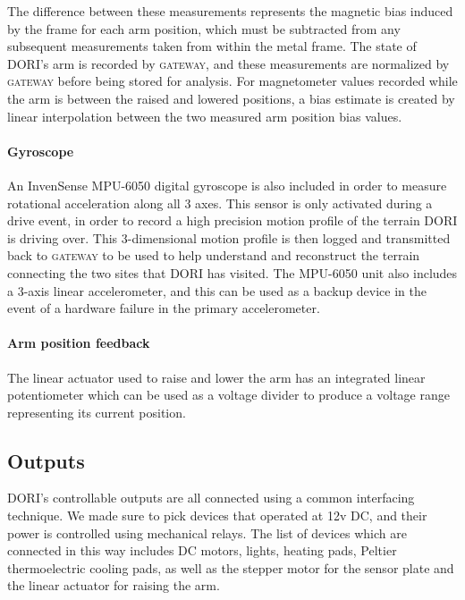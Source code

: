 \documentclass[12pt]{article}
\newcommand{\brand}{}
\begin{document}
    
    
    The difference between these measurements represents the magnetic bias induced by the frame for each arm position, which must be subtracted from any subsequent measurements taken from within the metal frame. The state of DORI's arm is recorded by \textsc{gateway}, and these measurements are normalized by \textsc{gateway} before being stored for analysis. For magnetometer values recorded while the arm is between the raised and lowered positions, a bias estimate is created by linear interpolation between the two measured arm position bias values.

    \paragraph*{Gyroscope}
    An \brand{InvenSense MPU-6050} digital gyroscope is also included in order to measure rotational acceleration along all 3 axes. This sensor is only activated during a drive event, in order to record a high precision motion profile of the terrain DORI is driving over. This 3-dimensional motion profile is then logged and transmitted back to \textsc{gateway} to be used to help understand and reconstruct the terrain connecting the two sites that DORI has visited. The \brand{MPU-6050} unit also includes a 3-axis linear accelerometer, and this can be used as a backup device in the event of a hardware failure in the primary accelerometer.

    \paragraph*{Arm position feedback}
    The linear actuator used to raise and lower the arm has an integrated linear potentiometer which can be used as a voltage divider to produce a voltage range representing its current position. 


\subsection{Outputs}
    DORI's controllable outputs are all connected using a common interfacing technique. We made sure to pick devices that operated at 12v DC, and their power is controlled using mechanical relays. The list of devices which are connected in this way includes DC motors, lights, heating pads, Peltier thermoelectric cooling pads, as well as the stepper motor for the sensor plate and the linear actuator for raising the arm.
\end{document}
